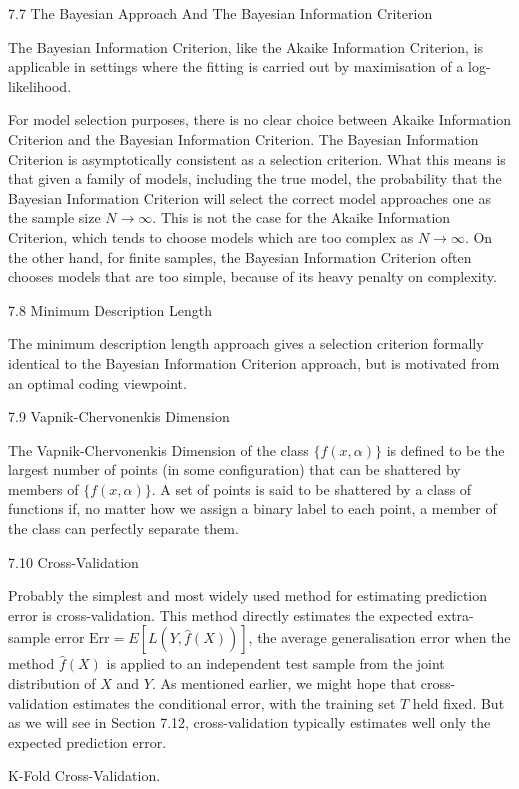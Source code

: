 7.7 The Bayesian Approach And The Bayesian Information Criterion

The Bayesian Information Criterion, like the Akaike Information Criterion, is applicable in settings where the fitting is carried out by maximisation of a log-likelihood.

For model selection purposes, there is no clear choice between Akaike Information Criterion and the Bayesian Information Criterion. The Bayesian Information Criterion is asymptotically consistent as a selection criterion. What this means is that given a family of models, including the true model, the probability that the Bayesian Information Criterion will select the correct model approaches one as the sample size $N \to \infty$. This is not the case for the Akaike Information Criterion, which tends to choose models which are too complex as $N \to \infty$. On the other hand, for finite samples, the Bayesian Information Criterion often chooses models that are too simple, because of its heavy penalty on complexity.

7.8 Minimum Description Length

The minimum description length approach gives a selection criterion formally identical to the Bayesian Information Criterion approach, but is motivated from an optimal coding viewpoint.

7.9 Vapnik-Chervonenkis Dimension

The Vapnik-Chervonenkis Dimension of the class $\{f(x,\alpha)\}$ is defined to be the largest number of points (in some configuration) that can be shattered by members of $\{f(x,\alpha)\}$. A set of points is said to be shattered by a class of functions if, no matter how we assign a binary label to each point, a member of the class can perfectly separate them.

7.10 Cross-Validation

Probably the simplest and most widely used method for estimating prediction error is cross-validation. This method directly estimates the expected extra-sample error $\text{Err}=E[L(Y,\hat{f}(X))]$, the average generalisation error when the method $\hat{f}(X)$ is applied to an independent test sample from the joint distribution of $X$ and $Y$. As mentioned earlier, we might hope that cross-validation estimates the conditional error, with the training set $T$ held fixed. But as we will see in Section 7.12, cross-validation typically estimates well only the expected prediction error.

K-Fold Cross-Validation.

